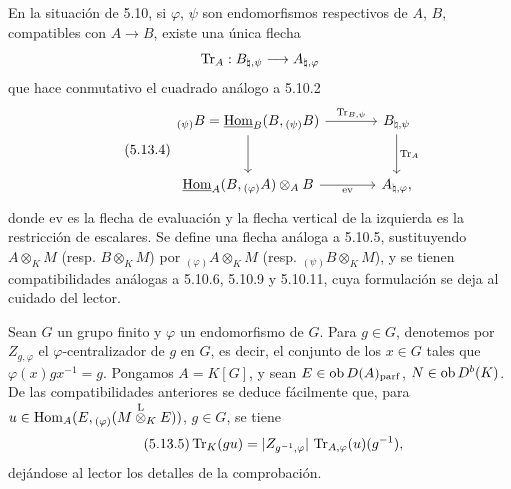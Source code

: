 En la situación de 5.10, si $\varphi$, $\psi$ son endomorfismos respectivos de $A$, $B$, compatibles con $A\to B$, existe una única flecha
\[
\operatorname{Tr}_A:B_{\natural,\psi}\longrightarrow A_{\natural,\varphi}
\]
que hace conmutativo el cuadrado análogo a 5.10.2
\begin{equation}\tag{5.13.4}
\begin{tikzcd}[column sep=large,row sep=large]
{}_{(\psi)}B=\uHom_B(B,{}_{(\psi)}B) \arrow[r,"\Tr_{B,\psi}"] \arrow[d] & B_{\natural,\psi} \arrow[d,"\Tr_A"]\\
\uHom_A(B,{}_{(\varphi)}A)\otimes_AB \arrow[r,"\mathrm{ev}"'] & A_{\natural,\varphi},
\end{tikzcd}
\end{equation}
donde $\mathrm{ev}$ es la flecha de evaluación y la flecha vertical de la izquierda es la restricción de escalares. Se define una flecha análoga a 5.10.5, sustituyendo $A\otimes_KM$ (resp. $B\otimes_KM$) por ${}_{(\varphi)}A\otimes_KM$ (resp. ${}_{(\psi)}B\otimes_KM$), y se tienen compatibilidades análogas a 5.10.6, 5.10.9 y 5.10.11, cuya formulación se deja al cuidado del lector.

Sean $G$ un grupo finito y $\varphi$ un endomorfismo de $G$. Para $g\in G$, denotemos por $Z_{g,\varphi}$ el $\varphi$-centralizador de $g$ en $G$, es decir, el conjunto de los $x\in G$ tales que $\varphi(x)gx^{-1}=g$. Pongamos $A=K[G]$, y sean $E\in\operatorname{ob} D(A)_{\mathrm{parf}}$, $N\in\operatorname{ob} D^b(K)$. De las compatibilidades anteriores se deduce fácilmente que, para $u\in\operatorname{Hom}_A(E,{}_{(\varphi)}(M\overset{\mathrm L}{\otimes}_KE))$, $g\in G$, se tiene
\begin{equation}\tag{5.13.5}
\operatorname{Tr}_K(gu)=|Z_{g^{-1},\varphi}|\,\operatorname{Tr}_{A,\varphi}(u)(g^{-1}),
\end{equation}
dejándose al lector los detalles de la comprobación.
